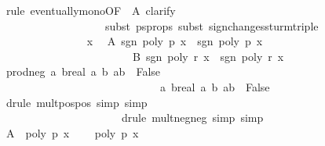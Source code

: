 \begin{isabellebody}
\ {\isacharparenleft}rule\ eventually{\isacharunderscore}mono{\isacharbrackleft}OF\ {\isacharunderscore}\ A{\isacharbrackright}{\isacharcomma}\ clarify{\isacharcomma}\isanewline
\ \ \ \ \ \ \ \ \ \ \ \ \ \ \ \ \ \ \ subst\ ps{\isacharprime}{\isacharunderscore}props{\isacharcomma}\ subst\ sign{\isacharunderscore}changes{\isacharunderscore}sturm{\isacharunderscore}triple{\isacharparenright}\isanewline
\ \ \ \ \ \ \ \ \ \ \ \ \ \ \isamarkupfalse%
\ x\ \isamarkupfalse%
\ A{\isacharcolon}\ {\isachardoublequoteopen}sgn\ {\isacharparenleft}poly\ p\ x{\isacharparenright}\ {\isacharequal}\ sgn\ {\isacharparenleft}poly\ p\ x\isanewline
\ \ \ \ \ \ \ \ \ \ \ \ \ \ \ \ \ \ \ \ \ \ \ \ B{\isacharcolon}\ {\isachardoublequoteopen}sgn\ {\isacharparenleft}poly\ r\ x{\isacharparenright}\ {\isacharequal}\ sgn\ {\isacharparenleft}poly\ r\ x\isanewline
\ \ \ \ \ \ \ \ \ \ \ \ \ \ \isamarkupfalse%
\ prod{\isacharunderscore}neg{\isacharcolon}\ {\isachardoublequoteopen}{\isasymAnd}a\ {\isacharparenleft}b{\isacharcolon}{\isacharcolon}real{\isacharparenright}{\isachardot}\ {\isasymlbrakk}a{\isachargreater}{}{\isacharsemicolon}\ b{\isachargreater}{}{\isacharsemicolon}\ a{\isacharasterisk}b{\isacharless}{}{\isasymrbrakk}\ {\isasymLongrightarrow}\ False{\isachardoublequoteclose}\isanewline
\ \ \ \ \ \ \ \ \ \ \ \ \ \ \ \ \ \ \ \ \ \ \ \ \ \ \ \ \ {\isachardoublequoteopen}{\isasymAnd}a\ {\isacharparenleft}b{\isacharcolon}{\isacharcolon}real{\isacharparenright}{\isachardot}\ {\isasymlbrakk}a{\isacharless}{}{\isacharsemicolon}\ b{\isacharless}{}{\isacharsemicolon}\ a{\isacharasterisk}b{\isacharless}{}{\isasymrbrakk}\ {\isasymLongrightarrow}\ False{\isachardoublequoteclose}\isanewline
\ \ \ \ \ \ \ \ \ \ \ \ \ \ \ \ \ \ \isamarkupfalse%
\ {\isacharparenleft}drule\ mult{\isacharunderscore}pos{\isacharunderscore}pos{\isacharcomma}\ simp{\isacharcomma}\ simp{\isacharcomma}\ \isanewline
\ \ \ \ \ \ \ \ \ \ \ \ \ \ \ \ \ \ \ \ \ \ drule\ mult{\isacharunderscore}neg{\isacharunderscore}neg{\isacharcomma}\ simp{\isacharcomma}\ simp{\isacharparenright}\isanewline
\ \ \ \ \ \ \ \ \ \ \ \ \ \ \isamarkupfalse%
\ A\ \ {\isacharbackquoteopen}poly\ p\ x\ {\isasymnoteq}\ {}{\isacharbackquoteclose}\ \isamarkupfalse%
\ {\isachardoublequoteopen}poly\ p\ x\ {\isasymnoteq}\ {}{\isachardoublequoteclose}\ \isanewline

\end{isabellebody}
